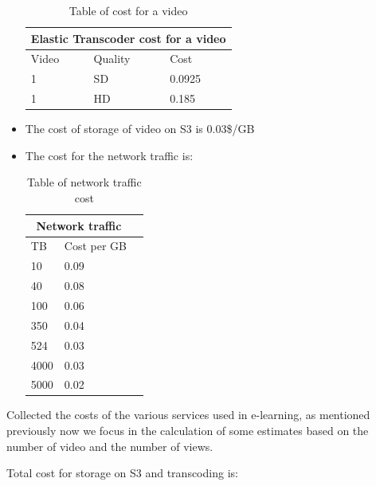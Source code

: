 \begin{itemize}
\begin{table}[h!]
\centering
\begin{tabular}{ |p{3cm}|p{3cm}|p{3cm}|  }
  \hline
  \multicolumn{3}{|c|}{Elastic Transcoder cost for a video} \\
  \hline
  Video & Quality & Cost \\
  \hline
  1 & SD & 0.0925 \\
  1 & HD & 0.185 \\
  \hline
\end{tabular}
\caption{Table of cost for a video}
\label{table:1}
\end{table}


\item The cost of storage of video on S3 is 0.03\$/GB
\item The cost for the network traffic is:


\begin{table}[h!]
\centering
\begin{tabular}{ |p{3cm}|p{3cm}|p{3cm}|  }
  \hline
  \multicolumn{2}{|c|}{Network traffic} \\
  \hline
  TB & Cost per GB \\
  \hline
  10 & 0.09 \\
  40 & 0.08 \\
  100 & 0.06 \\
  350 & 0.04 \\
  524 & 0.03 \\
  4000 & 0.03 \\
  5000 & 0.02 \\
  \hline
\end{tabular}
\caption{Table of network traffic cost}
\label{table:1}
\end{table}


\end{itemize}

Collected the costs of the various services used in e-learning, as mentioned previously now we focus in the calculation of some estimates based on the number of video and the number of views.

Total cost for storage on S3 and transcoding is:


